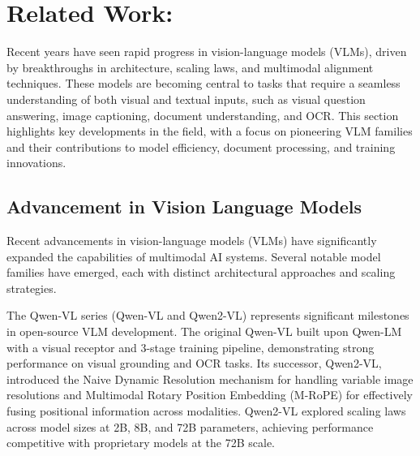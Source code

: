 \documentclass{article}
\begin{document}


\section{Related Work: }

Recent years have seen rapid progress in vision-language models (VLMs), driven by breakthroughs in architecture, scaling laws, and multimodal alignment techniques. These models are becoming central to tasks that require a seamless understanding of both visual and textual inputs, such as visual question answering, image captioning, document understanding, and OCR. This section highlights key developments in the field, with a focus on pioneering VLM families and their contributions to model efficiency, document processing, and training innovations. 

\subsection{Advancement in Vision Language Models}
Recent advancements in vision-language models (VLMs) have significantly expanded the capabilities of multimodal AI systems. Several notable model families have emerged, each with distinct architectural approaches and scaling strategies. 

The Qwen-VL\cite{bai2023qwenvlversatilevisionlanguagemodel} \cite{wang2024qwen2vlenhancingvisionlanguagemodels} series (Qwen-VL and Qwen2-VL) represents significant milestones in open-source VLM development. The original Qwen-VL\cite{bai2023qwenvlversatilevisionlanguagemodel} built upon Qwen-LM with a visual receptor and 3-stage training pipeline, demonstrating strong performance on visual grounding and OCR tasks. Its successor, Qwen2-VL, introduced the Naive Dynamic Resolution mechanism\cite{wang2024qwen2vlenhancingvisionlanguagemodels} for handling variable image resolutions and Multimodal Rotary Position Embedding (M-RoPE)\cite{wang2024qwen2vlenhancingvisionlanguagemodels} for effectively fusing positional information across modalities. Qwen2-VL explored scaling laws across model sizes at 2B, 8B, and 72B parameters, achieving performance competitive with proprietary models at the 72B scale. 
\end{document}
